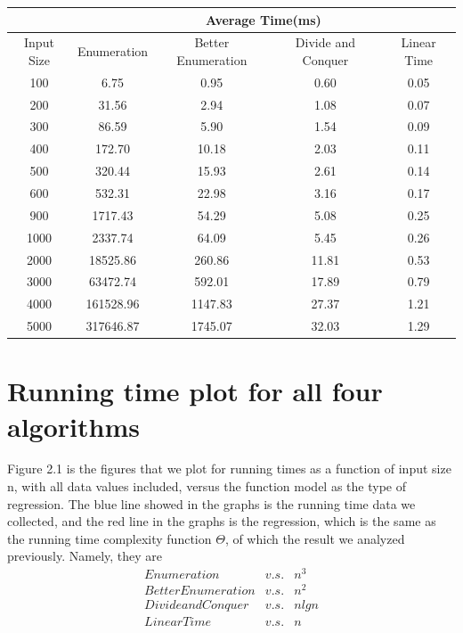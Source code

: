 \documentclass[11pt]{scrreprt}
\begin{document}
\begin{tabular}{|c|c|c|c|c|}
	\hline  & \multicolumn{4}{|c|}{Average Time(ms)} \\ 
	\hline Input Size & Enumeration & Better Enumeration & Divide and Conquer & Linear Time \\ 
	\hline  100 & 6.75 & 0.95 & 0.60 & 0.05 \\ 
	\hline  200 & 31.56 & 2.94 & 1.08 & 0.07 \\ 
	\hline  300 & 86.59 & 5.90 & 1.54 & 0.09 \\ 
	\hline  400 & 172.70 & 10.18 & 2.03 & 0.11 \\ 
	\hline  500 & 320.44 & 15.93 & 2.61 & 0.14 \\ 
	\hline  600 & 532.31 & 22.98 & 3.16 & 0.17 \\ 
	\hline  900 & 1717.43 & 54.29 & 5.08 & 0.25 \\ 
	\hline  1000 & 2337.74 & 64.09 & 5.45 & 0.26 \\ 
	\hline  2000 & 18525.86 & 260.86 & 11.81 & 0.53 \\ 
	\hline  3000 & 63472.74 & 592.01 & 17.89 & 0.79 \\ 
	\hline  4000 & 161528.96 & 1147.83 & 27.37 & 1.21 \\ 
	\hline  5000 & 317646.87 & 1745.07 & 32.03 & 1.29 \\
	\hline 
\end{tabular} 


\section {Running time plot for all four algorithms}

Figure 2.1 is the figures that we plot for running times as a function of input size n, with all data values included, versus the function model as the type of regression. The blue line showed in the graphs is the running time data we collected, and the red line in the graphs is the regression, which is the same as the running time complexity function $\Theta$, of which the result we analyzed previously. Namely, they are\\
\begin{eqnarray*}
Enumeration & v.s. & n^3\\
Better Enumeration & v.s. & n^2\\
Divide and Conquer & v.s. & nlgn\\
Linear Time & v.s. & n
\end{eqnarray*}
\end{document}
